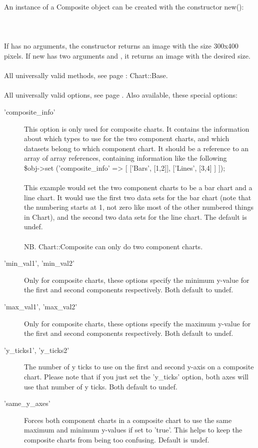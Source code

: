  An instance of a Composite object can be created with the constructor new():\\
\\
\\
\\
If  has no arguments, the constructor returns an image with the size 300x400 pixels. If new has two arguments  and , it returns an image with the desired size. \\ 
\\ 
All universally valid methods, see page \pageref{methods}: Chart::Base. \\
\\
 All universally valid options, see page \pageref{options}. Also available, these special options:
\begin{description}
\item['composite\_info']This option is only used for composite charts.  It contains the information about which types to use for the two component charts, and which datasets belong to which component chart. It should be a reference to an array of array references, containing information like the following\\
\$obj->set ('composite\_info' => [ ['Bars', [1,2]],                      ['Lines', [3,4] ] ]);\\
\\
This example would set the two component charts to be a bar chart and a line chart. It would use the first two data sets for the bar chart (note that the numbering starts at 1, not zero like most of the other numbered things in Chart), and the second two data sets for the line chart. The default is undef.\\
\\
NB. Chart::Composite can only do two component charts.
\item['min\_val1', 'min\_val2']Only for composite charts, these options specify the minimum y-value for the first and second components respectively. Both default to undef.
\item['max\_val1', 'max\_val2']Only for composite charts, these options specify the maximum y-value for the first and second components respectively. Both default to undef.
\item['y\_ticks1', 'y\_ticks2']The number of y ticks to use on the first and second y-axis on a composite chart.  Please note that if you just set the 'y\_ticks' option, both axes will use that number of y ticks. Both default to undef.
\item['same\_y\_axes']Forces both component charts in a composite chart to use the same maximum and minimum y-values if set to 'true'. This helps to keep the composite charts from being too confusing. Default is undef.
\end{description}